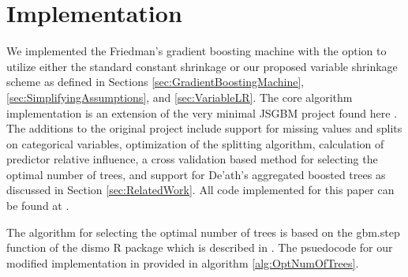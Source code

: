 \documentclass[9pt, conference]{IEEEtran}
\begin{document}
\section{Implementation}
We implemented the Friedman's gradient boosting machine with the option to utilize either the standard constant shrinkage or our proposed variable shrinkage scheme as defined in Sections \ref{sec:GradientBoostingMachine}, \ref{sec:SimplifyingAssumptions}, and \ref{sec:VariableLR}. The core algorithm implementation is an extension of the very minimal JSGBM project found here \cite{jsgbm}. The additions to the original project include support for missing values and splits on categorical variables, optimization of the splitting algorithm, calculation of predictor relative influence, a cross validation based method for selecting the optimal number of trees, and support for De'ath's aggregated boosted trees as discussed in Section \ref{sec:RelatedWork}. All code implemented for this paper can be found at \cite{myGithub}.

The algorithm for selecting the optimal number of trees is based on the gbm.step function of the dismo R package which is described in \cite{ecological}. The psuedocode for our modified implementation in provided in algorithm \ref{alg:OptNumOfTrees}.
\end{document}
